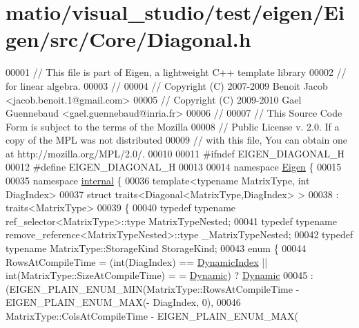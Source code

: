 \hypertarget{matio_2visual__studio_2test_2eigen_2_eigen_2src_2_core_2_diagonal_8h_source}{}\section{matio/visual\+\_\+studio/test/eigen/\+Eigen/src/\+Core/\+Diagonal.h}
\label{matio_2visual__studio_2test_2eigen_2_eigen_2src_2_core_2_diagonal_8h_source}

\begin{DoxyCode}
00001 \textcolor{comment}{// This file is part of Eigen, a lightweight C++ template library}
00002 \textcolor{comment}{// for linear algebra.}
00003 \textcolor{comment}{//}
00004 \textcolor{comment}{// Copyright (C) 2007-2009 Benoit Jacob <jacob.benoit.1@gmail.com>}
00005 \textcolor{comment}{// Copyright (C) 2009-2010 Gael Guennebaud <gael.guennebaud@inria.fr>}
00006 \textcolor{comment}{//}
00007 \textcolor{comment}{// This Source Code Form is subject to the terms of the Mozilla}
00008 \textcolor{comment}{// Public License v. 2.0. If a copy of the MPL was not distributed}
00009 \textcolor{comment}{// with this file, You can obtain one at http://mozilla.org/MPL/2.0/.}
00010 
00011 \textcolor{preprocessor}{#ifndef EIGEN\_DIAGONAL\_H}
00012 \textcolor{preprocessor}{#define EIGEN\_DIAGONAL\_H}
00013 
00014 \textcolor{keyword}{namespace }\hyperlink{namespace_eigen}{Eigen} \{ 
00015 
00035 \textcolor{keyword}{namespace }\hyperlink{namespaceinternal}{internal} \{
00036 \textcolor{keyword}{template}<\textcolor{keyword}{typename} MatrixType, \textcolor{keywordtype}{int} DiagIndex>
00037 \textcolor{keyword}{struct }traits<Diagonal<MatrixType,DiagIndex> >
00038  : traits<MatrixType>
00039 \{
00040   \textcolor{keyword}{typedef} \textcolor{keyword}{typename} ref\_selector<MatrixType>::type MatrixTypeNested;
00041   \textcolor{keyword}{typedef} \textcolor{keyword}{typename} remove\_reference<MatrixTypeNested>::type \_MatrixTypeNested;
00042   \textcolor{keyword}{typedef} \textcolor{keyword}{typename} MatrixType::StorageKind StorageKind;
00043   \textcolor{keyword}{enum} \{
00044     RowsAtCompileTime = (int(DiagIndex) == \hyperlink{namespace_eigen_a73c597189a4a99127175e8167c456fff}{DynamicIndex} || int(MatrixType::SizeAtCompileTime) =
      = \hyperlink{namespace_eigen_ad81fa7195215a0ce30017dfac309f0b2}{Dynamic}) ? \hyperlink{namespace_eigen_ad81fa7195215a0ce30017dfac309f0b2}{Dynamic}
00045                       : (EIGEN\_PLAIN\_ENUM\_MIN(MatrixType::RowsAtCompileTime - EIGEN\_PLAIN\_ENUM\_MAX(-
      DiagIndex, 0),
00046                                               MatrixType::ColsAtCompileTime - EIGEN\_PLAIN\_ENUM\_MAX( 

\end{DoxyCode}
